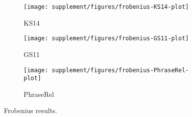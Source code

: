 \begin{figure}[b]
  \centering

  \begin{subfigure}[t]{0.9\textwidth}
  \texttt{[image: supplement/figures/frobenius-KS14-plot]}

  \caption{KS14}
  \label{fig:frobenius-ks14-plot}
  \end{subfigure}

  \begin{subfigure}[t]{0.9\textwidth}
  \texttt{[image: supplement/figures/frobenius-GS11-plot]}

  \caption{GS11}
  \label{fig:frobenius-gs11-plot}
  \end{subfigure}

  \begin{subfigure}[t]{0.9\textwidth}
  \texttt{[image: supplement/figures/frobenius-PhraseRel-plot]}

  \caption{PhraseRel}
  \label{fig:frobenius-phraserel-plot}
  \end{subfigure}

  \caption{Frobenius results.}
  \label{fig:frobenius-results}
\end{figure}
